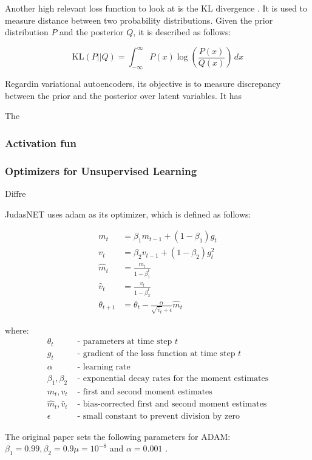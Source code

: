Another high relevant loss function to look at is the KL divergence  \cite{shlens2014notes}. It is used to measure distance between two probability distributions. Given the prior distribution $P$ and the posterior $Q$, it is described as follows:

\begin{equation}
    \text{KL}(P||Q) = \int_{-\infty}^{\infty} P(x) \log \left( \frac{P(x)}{Q(x)} \right) \, dx
\end{equation}

Regardin variational autoencoders, its objective is to measure discrepancy between the prior and the posterior over latent variables. It has 

The 

\subsubsection{Activation fun}


\subsubsection{Optimizers for Unsupervised Learning }

Diffre



JudasNET uses \Gls{adam} as its optimizer, which is defined as follows: 


\begin{align}
    m_t &= \beta_1 m_{t-1} + (1 - \beta_1) g_t \\
    v_t &= \beta_2 v_{t-1} + (1 - \beta_2) g_t^2 \\
    \hat{m}_t &= \frac{m_t}{1 - \beta_1^t} \\
    \hat{v}_t &= \frac{v_t}{1 - \beta_2^t} \\
    \theta_{t+1} &= \theta_t - \frac{\alpha}{\sqrt{\hat{v}_t} + \epsilon} \hat{m}_t
\end{align}

where:
\begin{align*}
    \theta_t & \text{ - parameters at time step } t \\
    g_t & \text{ - gradient of the loss function at time step } t \\
    \alpha & \text{ - learning rate} \\
    \beta_1, \beta_2 & \text{ - exponential decay rates for the moment estimates} \\
    m_t, v_t & \text{ - first and second moment estimates} \\
    \hat{m}_t, \hat{v}_t & \text{ - bias-corrected first and second moment estimates} \\
    \epsilon & \text{ - small constant to prevent division by zero}
\end{align*}

The original paper sets the following parameters for ADAM: $\beta_1 = 0.99, \beta_2 = 0.9 \mu=10^{-8}$ and $\alpha = 0.001$ \cite{kingma2017adam}.